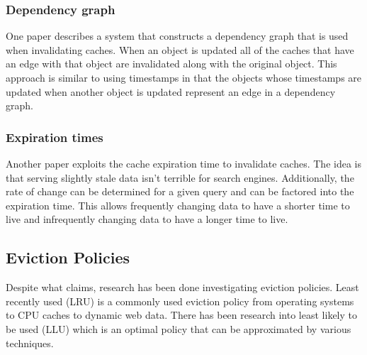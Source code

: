 \documentclass[12pt]{article}
\begin{document}
\subsubsection{Dependency graph}
One paper describes a system that constructs a dependency graph that is used when invalidating caches.\cite{scalableConsistentCaching}
When an object is updated all of the caches that have an edge with that object are invalidated along with the original object.
This approach is similar to using timestamps in that the objects whose timestamps are updated when another object is updated represent an edge in a dependency graph.

\subsubsection{Expiration times}
Another paper exploits the cache expiration time to invalidate caches.\cite{refreshingPerspectiveSearch}
The idea is that serving slightly stale data isn't terrible for search engines.
Additionally, the rate of change can be determined for a given query and can be factored into the expiration time.
This allows frequently changing data to have a shorter time to live and infrequently changing data to have a longer time to live.

\subsection{Eviction Policies}
Despite what \cite{refreshingPerspectiveSearch} claims, research has been done investigating eviction policies.
Least recently used (LRU) is a commonly used eviction policy from operating systems to CPU caches to dynamic web data.
There has been research into least likely to be used (LLU) which is an optimal policy that can be approximated by various techniques.


\end{document}
